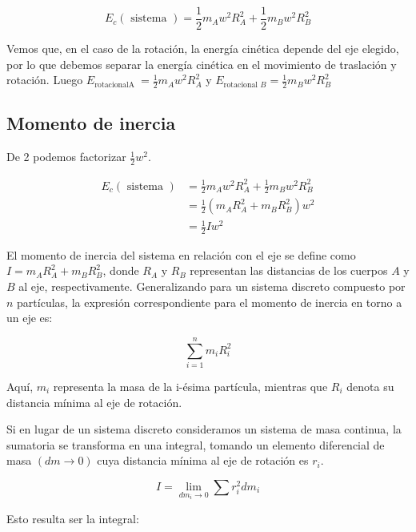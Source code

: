 \documentclass[10pt]{article}
\begin{document}
\begin{equation*}
E_{c}(\text { sistema })=\frac{1}{2} m_{A} w^{2} R_{A}^{2}+\frac{1}{2} m_{B} w^{2} R_{B}^{2} \tag{2}
\end{equation*}


Vemos que, en el caso de la rotación, la energía cinética depende del eje elegido, por lo que debemos separar la energía cinética en el movimiento de traslación y rotación. Luego $E_{\text {rotacionalA }}=\frac{1}{2} m_{A} w^{2} R_{A}^{2}$ y $E_{\text {rotacional } B}=\frac{1}{2} m_{B} w^{2} R_{B}^{2}$

\subsection{Momento de inercia}
De 2 podemos factorizar $\frac{1}{2} w^{2}$.

$$
\begin{aligned}
E_{c}(\text { sistema }) & =\frac{1}{2} m_{A} w^{2} R_{A}^{2}+\frac{1}{2} m_{B} w^{2} R_{B}^{2} \\
& =\frac{1}{2}\left(m_{A} R_{A}^{2}+m_{B} R_{B}^{2}\right) w^{2} \\
& =\frac{1}{2} I w^{2}
\end{aligned}
$$

El momento de inercia del sistema en relación con el eje se define como $I = m_A R_A^2 + m_B R_B^2$, donde $R_A$ y $R_B$ representan las distancias de los cuerpos $A$ y $B$ al eje, respectivamente.  
Generalizando para un sistema discreto compuesto por $n$ partículas, la expresión correspondiente para el momento de inercia en torno a un eje es:


\begin{equation*}
\sum_{i=1}^{n} m_{i} R_{i}^{2} \tag{3}
\end{equation*}


Aquí, $m_i$ representa la masa de la i-ésima partícula, mientras que $R_i$ denota su distancia mínima al eje de rotación.  

Si en lugar de un sistema discreto consideramos un sistema de masa continua, la sumatoria se transforma en una integral, tomando un elemento diferencial de masa $(dm \rightarrow 0)$ cuya distancia mínima al eje de rotación es $r_i$.

\begin{equation*}
I=\lim _{d m_{i} \rightarrow 0} \sum r_{i}^{2} d m_{i} \tag{4}
\end{equation*}


Esto resulta ser la integral:
\end{document}
